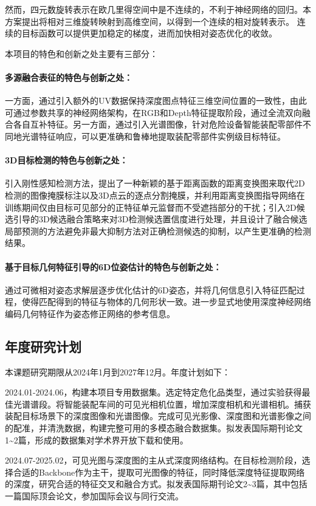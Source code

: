 \documentclass[12pt]{article}
\newcommand{\myPara}[1]{\paragraph{#1：}}
\begin{document}
然而，四元数旋转表示在欧几里得空间中是不连续的，不利于神经网络的回归。本方案提出将相对三维旋转映射到高维空间，以得到一个连续的相对旋转表示。
连续的目标函数可以提供更加稳定的梯度，进而加快相对姿态优化的收敛。
    





本项目的特色和创新之处主要有三部分：
\myPara{多源融合表征的特色与创新之处}
一方面，通过引入额外的UV数据保持深度图点特征三维空间位置的一致性，由此可通过参数共享的神经网络架构，在RGB和Depth特征提取阶段，通过全流双向融合各自互补特征。另一方面，通过引入光谱图像，针对危险设备智能装配零部件不同地光谱特征响应，可以更准确和鲁棒地提取装配零部件实例级目标特征。
\myPara{3D目标检测的特色与创新之处}
引入刚性感知检测方法，提出了一种新颖的基于距离函数的距离变换图来取代2D检测的图像掩膜标注以及3D点云的逐点分割掩膜，并利用距离变换图指导网络在训练期间仅由目标可见部分的正特征单元监督而不受遮挡部分的干扰；引入2D候选引导的3D候选融合策略来对3D检测候选置信度进行处理，并且设计了融合候选局部预测的方法避免非最大抑制方法对正确检测候选的抑制，以产生更准确的检测结果。
\myPara{基于目标几何特征引导的6D位姿估计的特色与创新之处}
通过可微相对姿态求解层逐步优化估计的6D姿态，并将几何信息引入特征匹配过程，使得匹配得到的特征与物体的几何形状一致。进一步显式地使用深度神经网络编码几何特征作为姿态修正网络的参考信息。


\subsection{年度研究计划}

本课题研究期限从2024年1月到2027年12月。年度计划如下：  

2024.01-2024.06，构建本项目专用数据集。选定特定危化品类型，通过实验获得最佳光谱谱段。将智能装配车间的可见光相机位置，增加深度相机和光谱相机。捕获装配目标场景下的深度图像和光谱图像。完成可见光影像、深度图和光谱影像之间的配准，并清洗数据，构建完整可用的多模态融合数据集。拟发表国际期刊论文1\textasciitilde2篇，形成的数据集对学术界开放下载和使用。

2024.07-2025.02，可见光图与深度图的主从式深度网络结构。在目标检测阶段，选择合适的Backbone作为主干，提取可光图像的特征，同时降低深度特征提取网络的深度，研究合适的特征交叉和融合方式。拟发表国际期刊论文2\textasciitilde3篇，其中包括一篇国际顶会论文，参加国际会议与同行交流。
\end{document}
